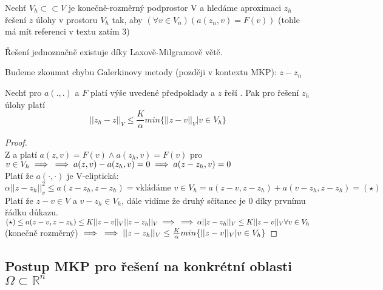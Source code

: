 \documentclass[../main.tex]{subfiles}
\begin{document}
Nechť $V_h \subset \subset V$ je konečně-rozměrný podprostor V a hledáme aproximaci $z_h$ řešení $z$ úlohy  v prostoru $V_h$ tak, aby $(\forall v\in V_n)(a(z_n,v) = F(v))$ (tohle má mít referenci v textu zatím 3)


\begin{remark}
    Řešení  jednoznačně existuje díky Laxově-Milgramově větě.
\end{remark}

\begin{remark}
    Budeme zkoumat chybu Galerkinovy metody (později v kontextu MKP): $z-z_n$
\end{remark}

\begin{theorem}[Céova]
    

Nechť pro $a(.,.)$ a $F$ platí výše uvedené předpoklady a $z$ řeší  . Pak pro řešení $z_h$ úlohy  platí 
\begin{equation}
    ||z_h - z||_V \leq \frac{K}{\alpha} min\{||z - v||_V | v\in V_h \}
\end{equation} 
\end{theorem}

\begin{proof}
    \ \\
    Z  a  platí $a(z,v) = F(v) \wedge a(z_h, v) = F(v)$ pro $ v\in V_h  \implies \\ \implies a(z,v) - a(z_h,v)=0 \implies a(z - z_h, v)= 0$
    \\
    Platí že $a(\cdot,\cdot)$ je V-eliptická:\\ $\alpha ||z - z_h||^2_v \leq a(z-z_h, z-z_h) = \text{vkládáme } v \in V_h = a(z-v, z-z_h) + a(v-z_h, z-z_h) = (\star)$
    \\
    Platí že $z-v \in V$ a $v - z_h \in V_h$, dále vidíme že druhý sčítanec je 0 díky prvnímu řádku důkazu. 
    \\
    $(\star) \leq a(z-v, z-z_h) \leq K ||z-v||_V ||z-z_h||_V \implies \\ \implies \alpha||z-z_h||_V \leq K ||z-v||_V \forall v\in V_h$ (konečně rozměrný)
$\implies \\ \implies ||z-z_h||_V  \leq \frac{K}{\alpha} min\{||z-v||_V |v\in V_h  \}$
\end{proof}


\subsection{Postup MKP pro řešení  na konkrétní oblasti $\Omega\subset\mathbb{R}^n$}
\end{document}
